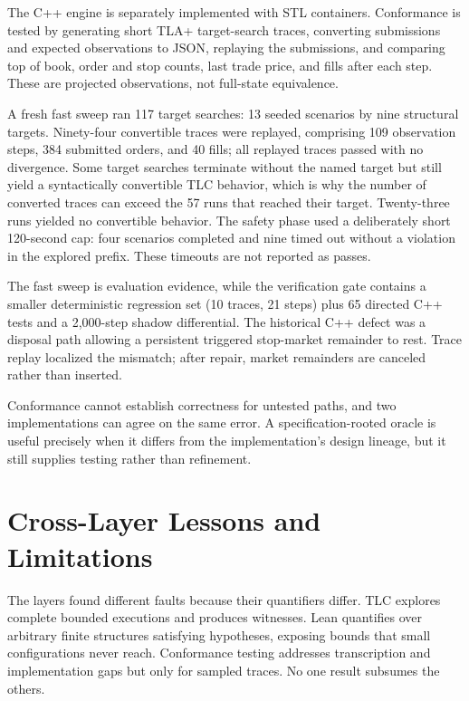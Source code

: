 \documentclass[runningheads]{llncs}
\begin{document}
The C++ engine is separately implemented with STL containers. Conformance is
tested by generating short TLA+ target-search traces, converting submissions
and expected observations to JSON, replaying the submissions, and comparing
top of book, order and stop counts, last trade price, and fills after each
step. These are projected observations, not full-state equivalence.

A fresh fast sweep ran 117 target searches: 13 seeded scenarios by nine
structural targets. Ninety-four convertible traces were replayed, comprising
109 observation steps, 384 submitted orders, and 40 fills; all replayed traces
passed with no divergence. Some target searches terminate without the named
target but still yield a syntactically convertible TLC behavior, which is why
the number of converted traces can exceed the 57 runs that reached their
target. Twenty-three runs yielded no convertible behavior. The safety phase
used a deliberately short 120-second cap: four scenarios completed and nine
timed out without a violation in the explored prefix. These timeouts are not
reported as passes.

The fast sweep is evaluation evidence, while the verification gate contains a
smaller deterministic regression set (10 traces, 21 steps) plus 65 directed
C++ tests and a 2,000-step shadow differential. The historical C++ defect was
a disposal path allowing a persistent triggered stop-market remainder to
rest. Trace replay localized the mismatch; after repair, market remainders are
canceled rather than inserted.

Conformance cannot establish correctness for untested paths, and two
implementations can agree on the same error. A specification-rooted oracle is
useful precisely when it differs from the implementation's design lineage,
but it still supplies testing rather than refinement.

\section{Cross-Layer Lessons and Limitations}

The layers found different faults because their quantifiers differ. TLC
explores complete bounded executions and produces witnesses. Lean quantifies
over arbitrary finite structures satisfying hypotheses, exposing bounds that
small configurations never reach. Conformance testing addresses transcription
and implementation gaps but only for sampled traces. No one result subsumes
the others.
\end{document}
